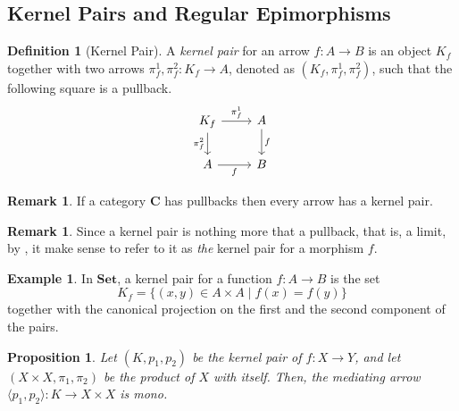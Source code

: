 \documentclass[runningheads,envcountsect]{llncs}
\newcommand{\cat}[1]{\ensuremath{\mathbf{#1}}}
\theoremstyle{plain}
\newtheorem{prop}[theorem]{Proposition}
\theoremstyle{definition}
\newtheorem{definition}[theorem]{Definition}
\newtheorem{example}[theorem]{Example}
\newtheorem{remark}[theorem]{Remark}
\newcommand{\Set}{\mathbf{Set}}
\begin{document}
\subsection{Kernel Pairs and Regular Epimorphisms}

\begin{definition}[Kernel Pair]
    A \emph{kernel pair} for an arrow $f: A \to B$ is an object $K_f$ together with two arrows $\pi^1_f, \pi^2_f : K_f \to A$, denoted as $(K_f, \pi^1_f, \pi^2_f)$, such that the following square is a pullback.
    \[
        \begin{tikzcd}
            K_f \ar[r, "{\pi^1_f}"] \ar[d, "{\pi^2_f}" swap] & A \arrow[d, "f"] \\
            A \ar[r, "f"swap] & B
        \end{tikzcd}
    \]
\end{definition}

\begin{remark}
	If a category $\cat{C}$ has pullbacks then every arrow has a kernel pair.
\end{remark}

\begin{remark}
    Since a kernel pair is nothing more that a pullback, that is, a limit, by , it make sense to refer to it as \emph{the} kernel pair for a morphism $f$.
\end{remark}

\begin{example}\label{ex:kernel_pairs_in_Set}
    In $\Set$, a kernel pair for a function $f: A\to B$ is the set
    \[
        K_f=\{(x, y) \in A \times A \mid f(x) = f(y)\}
    \]
    together with the canonical projection on the first and the second component of the pairs.
\end{example}

\begin{prop}\label{prop:pairng_of_kernel_pairs_mono}
    Let $(K, p_1, p_2)$ be the kernel pair of $f: X \to Y$, and let $(X\times X, \pi_1, \pi_2)$ be the product of $X$ with itself. Then, the mediating arrow $\langle p_1, p_2\rangle : K \to X \times X$ is mono.
\end{prop}
\end{document}
